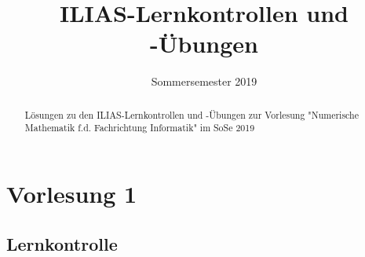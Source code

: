 \documentclass[]{article}
\title{ILIAS-Lernkontrollen und -Übungen}
\date{Sommersemester 2019}
\begin{document}
\tableofcontents
\maketitle

\begin{abstract}
Lösungen zu den ILIAS-Lernkontrollen und -Übungen zur Vorlesung "Numerische Mathematik f.d. Fachrichtung Informatik" im SoSe 2019
\end{abstract}

\section{Vorlesung 1}
\subsection{Lernkontrolle}
\end{document}

